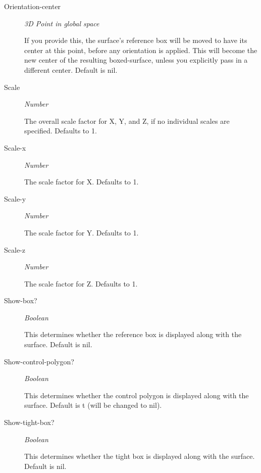 \documentclass [11pt]{book}
\begin{document}
\begin{itemize}
\begin{description}
\item [Orientation-center]
\emph{3D Point in global space}

 If you provide this, the surface's reference box will be moved to have its center
at this point, before any orientation is applied. This will become the new center of the resulting boxed-surface,
unless you explicitly pass in a different center. Default is nil.




\item [Scale]
\emph{Number}

 The overall scale factor for X, Y, and Z, if no individual scales are specified. Defaults to 1.




\item [Scale-x]
\emph{Number}

 The scale factor for X. Defaults to 1.




\item [Scale-y]
\emph{Number}

 The scale factor for Y. Defaults to 1.




\item [Scale-z]
\emph{Number}

 The scale factor for Z. Defaults to 1.




\item [Show-box?]
\emph{Boolean}

 This determines whether the reference box is displayed along with the surface. Default is nil.




\item [Show-control-polygon?]
\emph{Boolean}

 This determines whether the control polygon is displayed along with the surface. Default is t (will be changed to nil).




\item [Show-tight-box?]
\emph{Boolean}

 This determines whether the tight box is displayed along with the surface. Default is nil.





\end{description}
\end{itemize}
\end{document}
